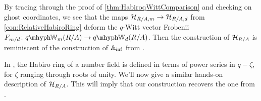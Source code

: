 \documentclass[DIV=12,numbers=enddot,leqno,bibliography=totoc]{scrartcl}
\begin{document}
	\begin{rem}\label{rem:HabiroIsAinf?}
		By tracing through the proof of \cref{thm:HabiroqWittComparison} and checking on ghost coordinates, we see that the maps $\mathcal{H}_{R/A,  m}\rightarrow \mathcal{H}_{R/A,  d}$ from \cref{con:RelativeHabiroRing} deform the $q$-Witt vector Frobenii $F_{m/d}\colon \qIW_m(R/A)\rightarrow \qIW_d(R/A)$. Then the construction of $\mathcal{H}_{R/A}$ is reminiscent of the construction of $\mathbb{A}_{\mathrm{inf}}$ from \cite[Lemma~]{BMS1}.
	\end{rem}
	
	In \cite[Definition~]{HabiroRingOfNumberField}, the Habiro ring of a number field is defined in terms of power series in $q-\zeta$, for $\zeta$ ranging through roots of unity. We'll now give a similar hands-on description of $\mathcal{H}_{R/A}$. This will imply that our construction recovers the one from \cite{HabiroRingOfNumberField}.
	
\end{document}

